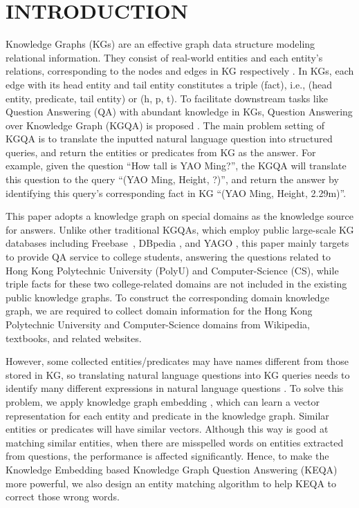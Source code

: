 \documentclass[11pt]{article}
\begin{document}
\maketitle

\section{INTRODUCTION}
Knowledge Graphs (KGs) are an effective graph data structure modeling relational information. They consist of real-world entities and each entity's relations, corresponding to the nodes and edges in KG respectively \cite{c1, c2}. In KGs, each edge with its head entity and tail entity constitutes a triple (fact), i.e., (head entity, predicate, tail entity) or (h, p, t). To facilitate downstream tasks like Question Answering (QA) with abundant knowledge in KGs, Question Answering over Knowledge Graph (KGQA) is proposed \cite{c3, c4}. The main problem setting of KGQA is to translate the inputted natural language question into structured queries, and return the entities or predicates from KG as the answer. For example, given the question ``How tall is YAO Ming?'', the KGQA will translate this question to the query ``(YAO Ming, Height, ?)'', and return the answer by identifying this query's corresponding fact in KG ``(YAO Ming, Height, 2.29m)''.

This paper adopts a knowledge graph on special domains as the knowledge source for answers. Unlike other traditional KGQAs, which employ public large-scale KG databases including Freebase~\cite{Bollacker-etal08Freebase}, DBpedia \cite{c13}, and YAGO \cite{c14}, this paper mainly targets to provide QA service to college students, answering the questions related to Hong Kong Polytechnic University (PolyU) and Computer-Science (CS), while triple facts for these two college-related domains are not included in the existing public knowledge graphs. To construct the corresponding domain knowledge graph, we are required to collect domain information for the Hong Kong Polytechnic University and Computer-Science domains from Wikipedia, textbooks, and related websites.

However, some collected entities/predicates may have names different from those stored in KG, so translating natural language questions into KG queries needs to identify many different expressions in natural language questions \cite{c8, c9}. To solve this problem, we apply knowledge graph embedding \cite{c9, c11}, which can learn a vector representation for each entity and predicate in the knowledge graph. Similar entities or predicates will have similar vectors. Although this way is good at matching similar entities, when there are misspelled words on entities extracted from questions, the performance is affected significantly. Hence, to make the Knowledge Embedding based Knowledge Graph Question Answering (KEQA) more powerful, we also design an entity matching algorithm to help KEQA to correct those wrong words.
\end{document}
